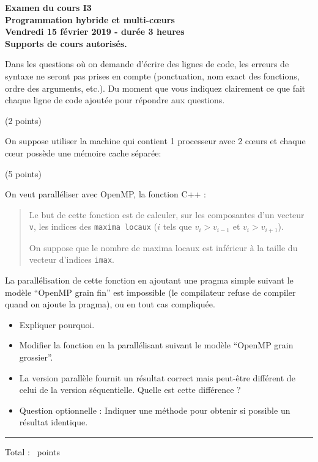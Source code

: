 \documentclass[12pt]{report}
\newcounter{cptPoints}
\newcounter{cptQuestions}
\newcommand\question[2]{\bigskip\par\addtocounter{cptQuestions}{1}\addtocounter{cptPoints}{#2}{\bf Question #1 n\textsuperscript{o} \thecptQuestions} (#2 points)\par}
\begin{document}
	\begin{center}\Large\bf
			Examen du cours I3\\
			Programmation hybride et multi-c\oe urs\\[0.4cm]
			Vendredi 15 f\'evrier 2019 - dur\'ee 3 heures\\
			Supports de cours autoris\'es.
		\end{center}
	\bigskip
	Dans les questions o\`u on demande d'\'ecrire des lignes de code, les erreurs de syntaxe ne seront pas prises en compte (ponctuation, nom exact des fonctions, ordre des arguments, etc.). Du moment que vous indiquez clairement ce que fait chaque ligne de code ajout\'ee pour r\'epondre aux questions.
		
	\bigskip
	
	\question{}2
	On suppose utiliser la machine qui contient 1 processeur avec 2 c{\oe}urs et chaque c{\oe}ur possède une mémoire cache séparée:
	
	
	\question{}5
	\medskip
	On veut paralléliser avec OpenMP, la fonction C++ :
	
	
	\begin{quotation}\noindent%
		Le but de cette fonction est de calculer, sur les composantes d'un vecteur {\tt v}, les indices des {\tt maxima locaux} ($i$ tels que $v_i > v_{i-1}$ et $v_i > v_{i+1}$).
		
		\noindent%
		On suppose que le nombre de maxima locaux est inférieur à la taille du vecteur d'indices {\tt imax}.
	\end{quotation}
	 
 La parallélisation de cette fonction en ajoutant une pragma simple suivant le modèle ``OpenMP grain fin'' est impossible (le compilateur refuse de compiler quand on ajoute la pragma), ou en tout cas compliquée.
 
	 \begin{itemize}
	 	\item Expliquer pourquoi.
	 	\item Modifier la fonction en la parallélisant suivant le modèle ``OpenMP grain grossier''.
	 	\item La version parallèle fournit un résultat correct mais peut-être différent de celui de la version séquentielle. Quelle est cette différence ?
	 	\item Question optionnelle : Indiquer une méthode pour obtenir si possible un résultat identique.
	 \end{itemize}
	 
         
\bigskip \rule{3cm}{.1pt}

Total : \thecptPoints \ points
 
\end{document}

